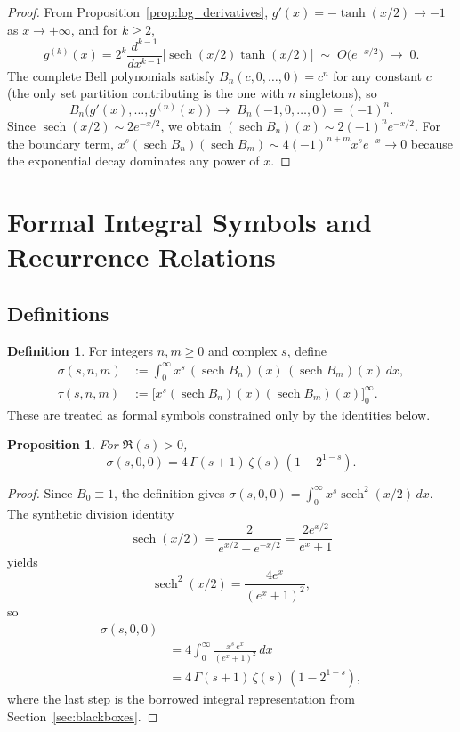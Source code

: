 \documentclass[article]{article}
\theoremstyle{plain}
\newtheorem{proposition}[theorem]{Proposition}
\theoremstyle{definition}
\newtheorem{definition}[theorem]{Definition}
\DeclareMathOperator{\sech}{sech}
\begin{document}
\begin{proof}
From Proposition~\ref{prop:log_derivatives}, $g'(x)=-\tanh(x/2)\to-1$ as $x\to+\infty$,
and for $k\ge 2$,
\[
  g^{(k)}(x)=2^{k}\frac{d^{k-1}}{dx^{k-1}}\bigl[\sech(x/2)\tanh(x/2)\bigr]
  \;\sim\; O\!\bigl(e^{-x/2}\bigr)\;\to\; 0.
\]
The complete Bell polynomials satisfy $B_{n}(c,0,\ldots,0)=c^{n}$ for any constant $c$
(the only set partition contributing is the one with $n$ singletons), so
\[
  B_{n}\bigl(g'(x),\ldots,g^{(n)}(x)\bigr)\;\to\; B_{n}(-1,0,\ldots,0)=(-1)^{n}.
\]
Since $\sech(x/2)\sim 2e^{-x/2}$, we obtain $(\sech B_{n})(x)\sim 2(-1)^{n}e^{-x/2}$.
For the boundary term, $x^{s}(\sech B_{n})(\sech B_{m})\sim 4(-1)^{n+m}x^{s}e^{-x}\to 0$
because the exponential decay dominates any power of $x$.
\end{proof}
\section{Formal Integral Symbols and Recurrence Relations}\label{sec:IBP}

\subsection{Definitions}

\begin{definition}\label{def:sigma_tau}
For integers $n,m\ge0$ and complex $s$, define
\begin{align*}
\sigma(s,n,m) &:= \int_{0}^{\infty} x^{s}\,(\sech B_{n})(x)\,(\sech B_{m})(x)\,dx,\\
\tau(s,n,m) &:= \bigl[x^{s}(\sech B_{n})(x)(\sech B_{m})(x)\bigr]_{0}^{\infty}.
\end{align*}
These are treated as formal symbols constrained only by the identities below.
\end{definition}

\begin{proposition}\label{prop:sigma_zeta}
For $\Re(s)>0$,
\[
  \sigma(s,0,0)=4\,\Gamma(s+1)\,\zeta(s)\,(1-2^{1-s}).
\]
\end{proposition}

\begin{proof}
Since $B_{0}\equiv 1$, the definition gives $\sigma(s,0,0)=\int_{0}^{\infty}x^{s}\sech^{2}(x/2)\,dx$.
The synthetic division identity
\[
  \sech(x/2)=\frac{2}{e^{x/2}+e^{-x/2}}=\frac{2e^{x/2}}{e^{x}+1}
\]
yields
\[
  \sech^{2}(x/2)=\frac{4e^{x}}{(e^{x}+1)^{2}},
\]
so
\begin{align*}
  \sigma(s,0,0) \\
  &=4\int_{0}^{\infty}\frac{x^{s}\,e^{x}}{(e^{x}+1)^{2}}\,dx \\
  &=4\,\Gamma(s+1)\,\zeta(s)\,(1-2^{1-s}),
\end{align*}
where the last step is the borrowed integral representation from
Section~\ref{sec:blackboxes}.
\end{proof}
\end{document}

